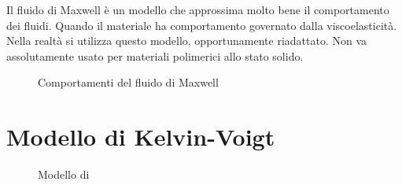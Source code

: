 Il fluido di Maxwell è un modello che approssima molto bene il comportamento dei fluidi. Quando il materiale ha comportamento governato dalla viscoelasticità.
Nella realtà si utilizza questo modello, opportunamente riadattato.
Non va assolutamente usato per materiali polimerici allo stato solido.

\begin{figure}
\centering
{}\quad	
{}	
\caption{Comportamenti del fluido di Maxwell}
\label{fig:ComportamentoMaxwell}
\end{figure}

\section{Modello di Kelvin-Voigt}

\begin{figure}
\centering
{}\quad
{}		
\caption{Modello di }
\label{des:KelvinVoigt}
\end{figure}

